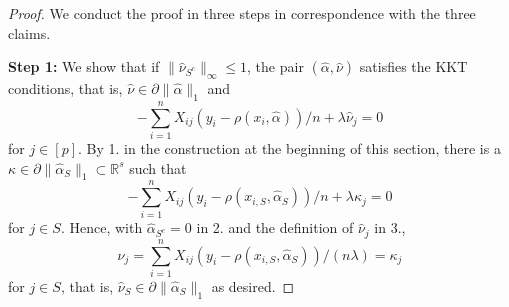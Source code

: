 \documentclass{elsarticle}
\newcommand\norm[1]{\lVert#1\rVert}
\newcommand{\estipara}{{\hat{\beta}}}
\newcommand{\tuning}{{\lambda}}
\newcommand{\R}{{\mathbb{R}}}
\newcommand{\primal}{{\hat{\alpha}}}
\newcommand{\prims}{{\hat{\alpha}_{S}}}
\newcommand{\primsc}{{\hat{\alpha}_{{S}^c}}}
\newcommand{\dual}{{\hat{\nu}}}
\newcommand{\duals}{{\hat{\nu}_{S}}}
\newcommand{\dualsc}{{\hat{\nu}_{{S}^c}}}
\newcommand{\dualj}{{\hat{\nu}_j}}
\begin{document}
\begin{proof}\enspace We conduct the proof in three steps in correspondence with the three claims. %

  \textbf{Step 1:}\enspace
   We show that if $\norm{\dualsc}_{\infty}\leq 1$, the pair $(\primal,\dual)$ satisfies the KKT conditions, that is, $\dual\in\partial \norm{\primal}_1$ and
  \[ -\sum_{i=1}^nX_{ij}\left(y_i-\rho(x_{i},\primal)\right)/n+\tuning \dualj=0\]
  for $j \in [p]$.
  By 1. in the construction at the beginning of this section,
    there is a $\kappa\in \partial\norm{\prims}_1\subset \R^{s}$ such that
  \[ -\sum_{i=1}^nX_{ij}\left(y_i-\rho(x_{i,S},\prims)\right)/n+\tuning \kappa_j=0\]
  for $j\in S$.
  Hence, with $\primsc=0$ in 2. and the definition of $\dualj$ in 3.,
  \[ \dualj=\sum_{i=1}^nX_{ij}\left(y_i-\rho(x_{i,S},\prims)\right)/(n\tuning)=\kappa_j\]
  for $j \in S$, that is, $\duals\in \partial \norm{\prims}_1$ as desired.


\end{proof}
\end{document}
